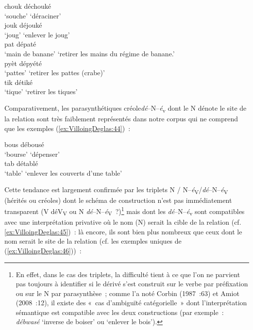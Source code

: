 \documentclass[output=paper]{langsci/langscibook}
\begin{document}
\ea \label{ex:VilloingDeglas:43}
      \ea \gll chouk \textrightarrow{} déchouké\\
        {`souche'} {} {`déraciner'}\\
      \ex \gll  jouk \textrightarrow{} déjouké\\
        {`joug'} {} {`enlever le joug'}\\
      \ex \gll  pat \textrightarrow{} dépaté\\
        {`main de banane'} {} {`retirer les mains du régime de banane.'}\\
      \ex \gll  pyèt \textrightarrow{} dépyété\\
        {`pattes'} {} {`retirer les pattes (crabe)'}\\
      \ex \gll  tik \textrightarrow{} détiké\\
        {`tique'} {} {`retirer les tiques'}\\
\z\z


Comparativement, les parasynthétiques créole\emph{dé}--N--\emph{é}\textsubscript{v}
dont le N dénote le site de la relation sont très faiblement représentés
dans notre corpus qui ne comprend que les exemples (\ref{ex:VilloingDeglas:44})~:

\ea \label{ex:VilloingDeglas:44}
      \ea \gll bous \textrightarrow{} débousé\\
        {`bourse'} {} {`dépenser'}\\
      \ex \gll  tab \textrightarrow{} détablé\\
        {`table'} {} {`enlever les couverts d'une table'}\\
\z\z

Cette tendance est largement confirmée par les triplets N /
N--\emph{é}\textsubscript{V}/\emph{dé}--N--\emph{é}\textsubscript{V} (hérités ou créoles) dont
le schéma de construction n'est pas immédiatement transparent (V \textrightarrow{}
déV\textsubscript{V} ou N \textrightarrow{}\emph{dé}--N--\emph{é}\textsubscript{V}~?)\footnote{En effet, dans le
  cas des triplets, la difficulté tient à ce que l'on ne parvient pas
  toujours à identifier si le dérivé s'est construit sur le verbe par
  préfixation ou sur le N par parasynthèse~; comme l'a noté Corbin
  (1987~:63) et Amiot (2008~:12), il existe des «~cas d'ambiguïté
  catégorielle~» dont l'interprétation sémantique est compatible avec
  les deux constructions (par exemple~: \emph{débwasé} `inverse de
  boiser' ou `enlever le bois').} mais dont les \emph{dé}--N--\emph{é}\textsubscript{v}
sont compatibles avec une interprétation privative où le nom (N) serait
la cible de la relation (cf. \ref{ex:VilloingDeglas:45})~: là encore, ils sont bien plus
nombreux que ceux dont le nom serait le site de la relation (cf. les
exemples uniques de (\ref{ex:VilloingDeglas:46}))~:
\end{document}
